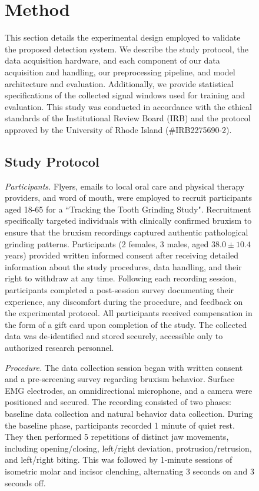 \documentclass[pdflatex,sn-vancouver-num, iicol]{sn-jnl}
\begin{document}
\begin{figure}[h]
\section{Method}

This section details the experimental design employed to validate the proposed detection system. We describe the study protocol, the data acquisition hardware, and each component of our data acquisition and handling, our preprocessing pipeline, and model architecture and evaluation. Additionally, we provide statistical specifications of the collected signal windows used for training and evaluation.  This study was conducted in accordance with the ethical standards of the Institutional Review Board (IRB) and the protocol approved by the University of Rhode Island (\#IRB2275690-2). 

\subsection{Study Protocol}
\textit{Participants.} Flyers, emails to local oral care and physical therapy providers, and word of mouth, were employed to recruit participants aged 18-65 for a ``Tracking the Tooth Grinding Study". Recruitment specifically targeted individuals with clinically confirmed bruxism to ensure that the bruxism recordings captured authentic pathological grinding patterns. Participants (2 females, 3 males, aged $38.0 \pm 10.4$ years) provided written informed consent after receiving detailed information about the study procedures, data handling, and their right to withdraw at any time. Following each recording session, participants completed a post-session survey documenting their experience, any discomfort during the procedure, and feedback on the experimental protocol. All participants received compensation in the form of a gift card upon completion of the study. The collected data was de-identified and stored securely, accessible only to authorized research personnel.

\textit{Procedure.} The data collection session began with written consent and a pre-screening survey regarding bruxism behavior. Surface EMG electrodes, an omnidirectional microphone, and a camera were positioned and secured. The recording consisted of two phases: baseline data collection and natural behavior data collection. During the baseline phase, participants recorded 1 minute of quiet rest. They then performed 5 repetitions of distinct jaw movements, including opening/closing, left/right deviation, protrusion/retrusion, and left/right biting. This was followed by 1-minute sessions of isometric molar and incisor clenching, alternating 3 seconds on and 3 seconds off. 


\end{figure}
\end{document}
